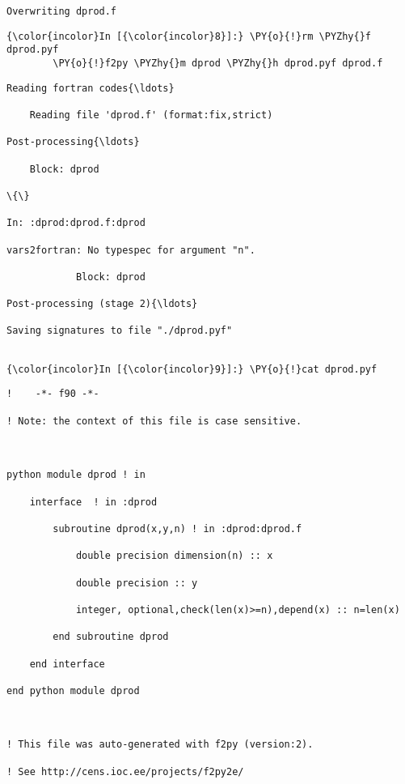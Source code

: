     \begin{Verbatim}[commandchars=\\\{\}]
Overwriting dprod.f

    \end{Verbatim}

    \begin{Verbatim}[commandchars=\\\{\}]
{\color{incolor}In [{\color{incolor}8}]:} \PY{o}{!}rm \PYZhy{}f dprod.pyf
        \PY{o}{!}f2py \PYZhy{}m dprod \PYZhy{}h dprod.pyf dprod.f
\end{Verbatim}

    \begin{Verbatim}[commandchars=\\\{\}]
Reading fortran codes{\ldots}

	Reading file 'dprod.f' (format:fix,strict)

Post-processing{\ldots}

	Block: dprod

\{\}

In: :dprod:dprod.f:dprod

vars2fortran: No typespec for argument "n".

			Block: dprod

Post-processing (stage 2){\ldots}

Saving signatures to file "./dprod.pyf"


    \end{Verbatim}



    \begin{Verbatim}[commandchars=\\\{\}]
{\color{incolor}In [{\color{incolor}9}]:} \PY{o}{!}cat dprod.pyf
\end{Verbatim}

    \begin{Verbatim}[commandchars=\\\{\}]
!    -*- f90 -*-

! Note: the context of this file is case sensitive.



python module dprod ! in 

    interface  ! in :dprod

        subroutine dprod(x,y,n) ! in :dprod:dprod.f

            double precision dimension(n) :: x

            double precision :: y

            integer, optional,check(len(x)>=n),depend(x) :: n=len(x)

        end subroutine dprod

    end interface 

end python module dprod



! This file was auto-generated with f2py (version:2).

! See http://cens.ioc.ee/projects/f2py2e/


    \end{Verbatim}



